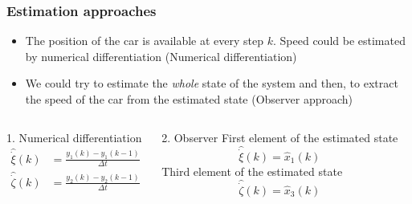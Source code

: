 \begin{frame}
    \frametitle{Estimation approaches}
    \begin{itemize}
        \item The position of the car is available at every step $k$. Speed could be estimated by numerical differentiation (Numerical differentiation)
        \item We could try to estimate the \emph{whole} state of the system and then, to extract the speed of the car from the estimated state (Observer approach)
    \end{itemize}
     \begin{columns}[t]
        \begin{block}{1. Numerical differentiation}
            \vspace*{-1em}
            \begin{align*}
            \hat{\dot{\xi}}(k)& = \frac{y_1(k) - y_1(k-1)}{\Delta t}\\
            \hat{\dot{\zeta}}(k)& = \frac{y_2(k) - y_2(k-1)}{\Delta t}
            \end{align*}
        \end{block}
        \begin{block}{2. Observer}
            First element of the estimated state
            $$\hat{\dot{\xi}}(k)= \hat{x}_1(k)$$
            Third element of the estimated state
            $$\hat{\dot{\zeta}}(k)=\hat{x}_3(k)$$
        \end{block}	
    \end{columns} 
\end{frame}

